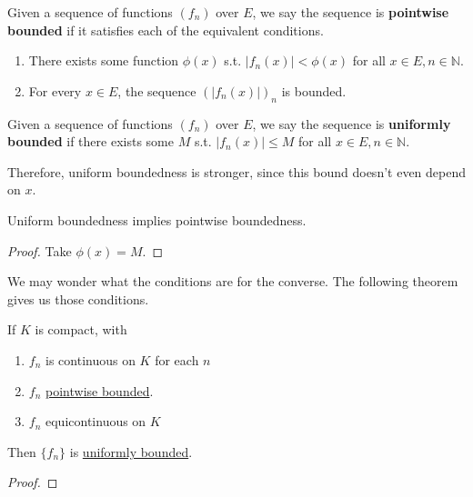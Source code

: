   \begin{definition}
    \label{def:pointwise-bounded}
    Given a sequence of functions $(f_n)$ over $E$, we say the sequence is \textbf{pointwise bounded} if it satisfies each of the equivalent conditions. 
    \begin{enumerate}
      \item There exists some function $\phi(x)$ s.t. $|f_n (x)| < \phi(x)$ for all $x \in E, n \in \mathbb{N}$. 
      \item For every $x \in E$, the sequence $(|f_n (x)|)_n$ is bounded. 
    \end{enumerate}
  \end{definition}

  \begin{definition}
    \label{def:uniformly-bounded}
    Given a sequence of functions $(f_n)$ over $E$, we say the sequence is \textbf{uniformly bounded} if there exists some $M$ s.t. $|f_n (x)| \leq M$ for all $x \in E, n \in \mathbb{N}$. 
  \end{definition}

  Therefore, uniform boundedness is stronger, since this bound doesn't even depend on $x$. 

  \begin{lemma}
    \label{thm:uniform-boundedness-implies-pointwise}
    Uniform boundedness implies pointwise boundedness. 
  \end{lemma}
  \begin{proof}
    Take $\phi(x) = M$. 
  \end{proof}

  We may wonder what the conditions are for the converse. The following theorem gives us those conditions. 

  \begin{theorem}
    \label{thm:conditions-for-uniform-boundedness}
    If $K$ is compact, with 
    \begin{enumerate}
      \item $f_n$ is continuous on $K$ for each $n$
      \item $f_n$ \hyperref[def:pointwise-bounded]{pointwise bounded}. 
      \item $f_n$ equicontinuous on $K$
    \end{enumerate}
    Then $\{f_n\}$ is \hyperref[def:uniformly-bounded]{uniformly bounded}. 
  \end{theorem}
  \begin{proof}
    
  \end{proof}

